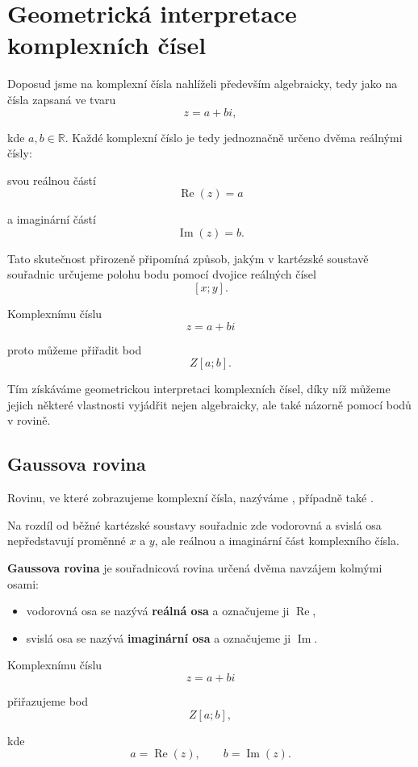 \documentclass[12pt,a4paper]{article}
\begin{document}

\section{Geometrická interpretace komplexních čísel}
Doposud jsme na komplexní čísla nahlíželi především algebraicky, 
tedy jako na čísla zapsaná ve tvaru
\[
    z=a+bi,
\]

kde $a,b\in\mathbb{R}$.
Každé komplexní číslo je tedy jednoznačně určeno dvěma reálnými čísly: 

svou reálnou částí
\[
    \operatorname{Re}(z)=a
\]

a imaginární částí
\[
    \operatorname{Im}(z)=b.
\]

Tato skutečnost přirozeně připomíná způsob, jakým v kartézské soustavě souřadnic
určujeme polohu bodu pomocí dvojice reálných čísel
\[
    [x;y].
\]

Komplexnímu číslu
\[
    z=a+bi
\]

proto můžeme přiřadit bod
\[
    Z[a;b].
\]

Tím získáváme geometrickou interpretaci komplexních čísel, díky níž můžeme
jejich některé vlastnosti vyjádřit nejen algebraicky, ale také názorně pomocí
bodů v rovině.


\subsection{Gaussova rovina}
Rovinu, ve které zobrazujeme komplexní čísla, 
nazýváme , 
případně také .

Na rozdíl od běžné kartézské soustavy souřadnic zde vodorovná a svislá osa
nepředstavují proměnné $x$ a $y$, ale reálnou a imaginární část komplexního čísla.

\begin{definitionbox}
    \textbf{Gaussova rovina} je souřadnicová rovina určená dvěma navzájem kolmými osami:
    \begin{itemize}
        \item vodorovná osa se nazývá \textbf{reálná osa} a označujeme ji $\operatorname{Re}$,
        \item svislá osa se nazývá \textbf{imaginární osa} a označujeme ji $\operatorname{Im}$.
    \end{itemize}

    Komplexnímu číslu
    \[
        z=a+bi
    \]

    přiřazujeme bod
    \[
        Z[a;b],
    \]

    kde
    \[
        a=\operatorname{Re}(z), \qquad b=\operatorname{Im}(z).
    \]
\end{definitionbox}
\end{document}
